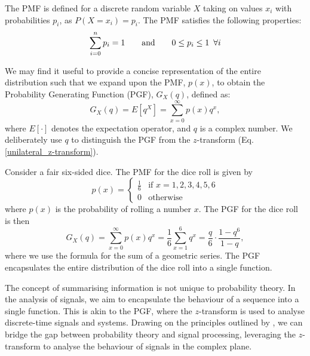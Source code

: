 \documentclass[a4paper]{report}
\begin{document}
The PMF is defined for a discrete random variable $X$ taking on values $x_i$ with probabilities $p_i$, as $P(X=x_i) = p_i$. The PMF satisfies the following properties:
\begin{equation}
    \sum_{i=0}^n p_i = 1 \hspace{2em}\text{and}\hspace{2em} 0 \leq p_i \leq 1 \hspace{0.5em}\forall i
\end{equation}

We may find it useful to provide a concise representation of the entire distribution such that we expand upon the PMF, $p(x)$, to obtain the Probability Generating Function (PGF), $G_X(q)$, defined as:
\begin{equation}
	G_X(q) = E[q^X] = \sum^{\infty}_{x = 0} p(x)q^x,
\end{equation}
where $E[\cdot]$ denotes the expectation operator, and $q$ is a complex number. We deliberately use $q$ to distinguish the PGF from the $z$-transform (Eq. \ref{unilateral_z-transform}).

\begin{example}
    Consider a fair six-sided dice. The PMF for the dice roll is given by
    \begin{equation}
        p(x) = \begin{cases}
            \frac{1}{6} & \text{if } x = 1, 2, 3, 4, 5, 6 \\
            0 & \text{otherwise}
        \end{cases}
    \end{equation}
    where $p(x)$ is the probability of rolling a number $x$. The PGF for the dice roll is then
    \begin{equation}
        G_X(q) = \sum^{\infty}_{x = 0} p(x)q^x = \frac{1}{6} \sum^6_{x = 1} q^x = \frac{q}{6}\cdot \frac{1-q^6}{1-q},
    \end{equation}
    where we use the formula for the sum of a geometric series. The PGF encapsulates the entire distribution of the dice roll into a single function.
\end{example}

The concept of summarising information is not unique to probability theory. In the analysis of signals, we aim to encapsulate the behaviour of a sequence into a single function. This is akin to the PGF, where the $z$-transform is used to analyse discrete-time signals and systems. Drawing on the principles outlined by \citet{ross2014introduction}, we can bridge the gap between probability theory and signal processing, leveraging the $z$-transform to analyse the behaviour of signals in the complex plane.
\end{document}
